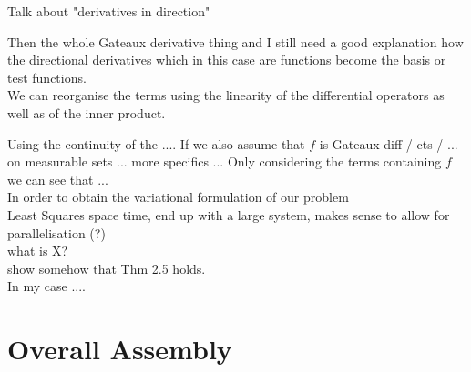 \documentclass[../draft_1.tex]{subfiles}
\begin{document}
Talk about "derivatives in direction" 

Then the whole Gateaux derivative thing and I still need a good explanation how the directional derivatives which in this case are functions become the basis or test functions. 
\smallskip
\\
We can reorganise the terms using the linearity of the differential operators as well as of the inner product. 

Using the continuity of the .... If we also assume that $f$ is Gateaux diff / cts / ... on measurable sets ... more specifics ... 
Only considering the terms containing $f$ we can see that ... 
\\ 
In order to obtain the variational formulation of our problem 
\\
Least Squares space time, end up with a large system, makes sense to allow for parallelisation (?) \\






what is X?
\bigskip
\\
show somehow that Thm 2.5 holds. \\

In my case .... \\


\section{Overall Assembly}
\end{document}
